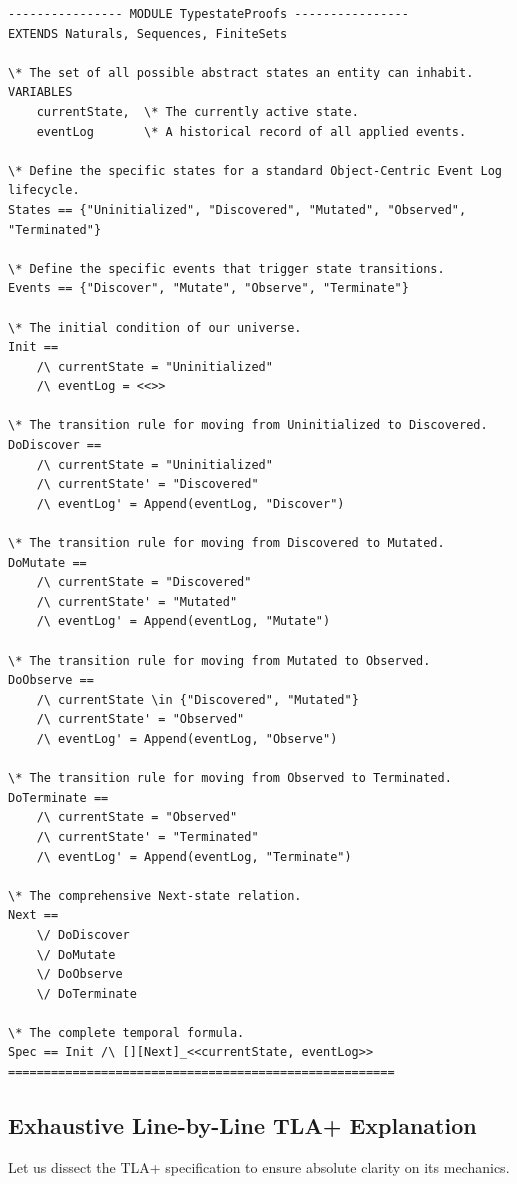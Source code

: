 \begin{lstlisting}[language=tla]
---------------- MODULE TypestateProofs ----------------
EXTENDS Naturals, Sequences, FiniteSets

\* The set of all possible abstract states an entity can inhabit.
VARIABLES
    currentState,  \* The currently active state.
    eventLog       \* A historical record of all applied events.

\* Define the specific states for a standard Object-Centric Event Log lifecycle.
States == {"Uninitialized", "Discovered", "Mutated", "Observed", "Terminated"}

\* Define the specific events that trigger state transitions.
Events == {"Discover", "Mutate", "Observe", "Terminate"}

\* The initial condition of our universe.
Init ==
    /\ currentState = "Uninitialized"
    /\ eventLog = <<>>

\* The transition rule for moving from Uninitialized to Discovered.
DoDiscover ==
    /\ currentState = "Uninitialized"
    /\ currentState' = "Discovered"
    /\ eventLog' = Append(eventLog, "Discover")

\* The transition rule for moving from Discovered to Mutated.
DoMutate ==
    /\ currentState = "Discovered"
    /\ currentState' = "Mutated"
    /\ eventLog' = Append(eventLog, "Mutate")

\* The transition rule for moving from Mutated to Observed.
DoObserve ==
    /\ currentState \in {"Discovered", "Mutated"}
    /\ currentState' = "Observed"
    /\ eventLog' = Append(eventLog, "Observe")

\* The transition rule for moving from Observed to Terminated.
DoTerminate ==
    /\ currentState = "Observed"
    /\ currentState' = "Terminated"
    /\ eventLog' = Append(eventLog, "Terminate")

\* The comprehensive Next-state relation.
Next ==
    \/ DoDiscover
    \/ DoMutate
    \/ DoObserve
    \/ DoTerminate

\* The complete temporal formula.
Spec == Init /\ [][Next]_<<currentState, eventLog>>
======================================================
\end{lstlisting}

\subsection{Exhaustive Line-by-Line TLA+ Explanation}

Let us dissect the TLA+ specification to ensure absolute clarity on its mechanics.

